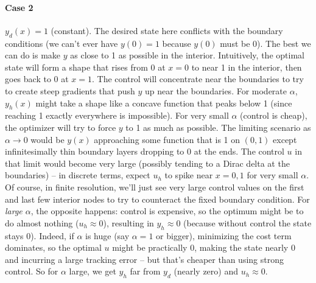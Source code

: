 \documentclass[a4paper,10pt]{article}
\begin{document}
\paragraph{Case 2}
\(y_d(x)=1\) (constant).
The desired state here conflicts with the boundary conditions (we can't ever have \(y(0)=1\) because \(y(0)\) must be 0). The best we can do is make \(y\) as close to 1 as possible in the interior. Intuitively, the optimal state will form a shape that rises from 0 at \(x=0\) to near 1 in the interior, then goes back to 0 at \(x=1\). The control will concentrate near the boundaries to try to create steep gradients that push \(y\) up near the boundaries. For moderate \(\alpha\), \(y_h(x)\) might take a shape like a concave function that peaks below 1 (since reaching 1 exactly everywhere is impossible). For very small \(\alpha\) (control is cheap), the optimizer will try to force \(y\) to 1 as much as possible. The limiting scenario as \(\alpha \to 0\) would be \(y(x)\) approaching some function that is 1 on \((0,1)\) except infinitesimally thin boundary layers dropping to 0 at the ends. The control \(u\) in that limit would become very large (possibly tending to a Dirac delta at the boundaries) -- in discrete terms, expect \(u_h\) to spike near \(x=0,1\) for very small \(\alpha\). Of course, in finite resolution, we'll just see very large control values on the first and last few interior nodes to try to counteract the fixed boundary condition. For \emph{large \(\alpha\)}, the opposite happens: control is expensive, so the optimum might be to do almost nothing (\(u_h \approx 0\)), resulting in \(y_h \approx 0\) (because without control the state stays 0). Indeed, if \(\alpha\) is huge (say \(\alpha=1\) or bigger), minimizing the cost term dominates, so the optimal \(u\) might be practically 0, making the state nearly 0 and incurring a large tracking error – but that's cheaper than using strong control. So for \(\alpha\) large, we get \(y_h\) far from \(y_d\) (nearly zero) and \(u_h \approx 0\).
\end{document}
